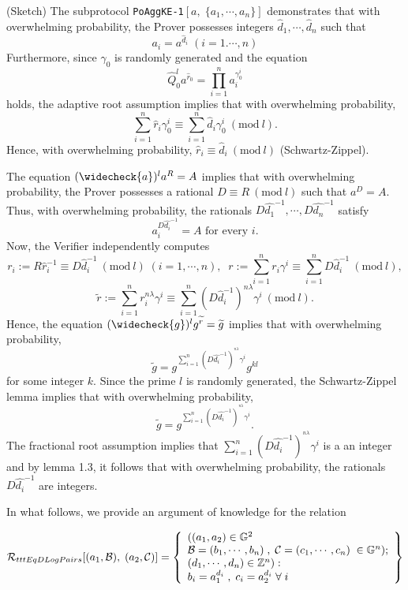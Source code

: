 \documentclass[11pt, lettersize, notitlepage, leqno, footskip=0.6cm]{article}
\newcommand{\pl}{\prod\limits}
\newcommand{\slim}{\sum\limits}
\newcommand{\ttt}{\texttt}
\newcommand{\wti}{\widetilde}
\newcommand{\mc}{\mathcal}
\newcommand{\mb}{\mathbb}
\newcommand{\lam}{\lambda}
\newcommand{\what}{\widehat}
\newcommand{\weck}{\widecheck}
\newcommand{\vs}{\vspace{-0.15cm}}
\newcommand{\op}{overwhelming probability}
\newcommand{\Mod}[1]{\ (\mathrm{mod}\ #1)}
\numberwithin{equation}{section}
\begin{document}
\begin{prf} (Sketch) The subprotocol \verb|PoAggKE-1|$[a,\;\{a_1,\cdots,a_n\}]$ demonstrates that with \op, the Prover possesses integers $\what{d}_1,\cdots,\what{d}_n$ such that \vs $$a_i = a^{\what{d}_i}\; (i=1.\cdots,n)$$ Furthermore, since $\gamma_0$ is randomly generated and the equation \vs $$\what{Q}_0^la^{\what{r}_0} = \pl_{i=1}^{n} a_i^{\gamma_0^i} $$ holds, the adaptive root assumption implies that with \op, \vs $$\slim_{i=1}^n\what{r}_i\gamma_0^i\equiv \slim_{i=1}^n \what{d}_i\gamma_0^i\Mod{l}.$$ Hence, with \op, $\what{r}_i\equiv \what{d}_i\Mod{l}$ (Schwartz-Zippel).

The equation $(\weck{a})^la^R= A $ implies that with \op, the Prover possesses a rational $D\equiv R\Mod{l}$ such that $a^D = A$. Thus, with \op, the rationals $D\what{d_1}^{-1},\cdots,D\what{d_n}^{-1}$ satisfy \vs $$a_i^{D\what{d_i}^{-1}} = A \text{ for every }i.$$ Now, the Verifier independently computes \vs $$r_i:= R\what{r}_{i}^{-1}\equiv D\what{d}_i^{-1}\Mod{l}\;(i=1,\cdots,n),\;\;r:= \slim_{i=1}^n r_i\gamma^i\equiv \slim_{i=1}^n D\what{d}_i^{-1}\Mod{l},$$\vspace{-0.3cm} $$\wti{r}:= {\slim_{i=1}^n r_i^{n\lam}\gamma^i}\equiv {\slim_{i=1}^n (D\what{d}_i^{-1})^{n\lam}\gamma^i}\Mod{l}.$$ Hence, the equation $(\weck{g})^lg^{\wti{r}} = \wti{g}$ implies that with \op, \vs $$\wti{g} = g^{\slim_{i=1}^n (D\what{d_i}^{-1})^{^{n\lam}}\gamma^i}g^{kl} $$ for some integer $k$. Since the prime $l$ is randomly generated, the Schwartz-Zippel lemma implies that with \op, \vs $$\wti{g} = g^{\slim_{i=1}^n (D\what{d_i}^{-1})^{^{n\lam}}\gamma^i}. $$ The fractional root assumption implies that $\slim_{i=1}^n (D\what{d_i}^{-1})^{^{n\lam}}\gamma^i$ is a an integer and by lemma 1.3, it follows that with \op, the rationals $D\what{d_i}^{-1}$ are integers.\end{prf}

In what follows, we provide an argument of knowledge for the relation \vs

\[
  \mc{R}_{{\\ttt{EqDLogPairs}}}[(a_1, \mc{B}),\; (a_2, \mc{C})] = \left\{\begin{array}{l}
  	((a_1, a_2)\in\mb{G}^2\\
    \mc{B} = (b_1,\cdots, b_n)\;,\;\mc{C} = (c_1,\cdots, c_n)\;\in\mb{G}^n);\\
    (d_1,\cdots,d_n)\in\mb{Z}^n): \\
    b_i = a_1^{d_i}\;,\;c_i = a_2^{d_i} \;\forall\;i
  \end{array}\right\}
\]
\end{document}

